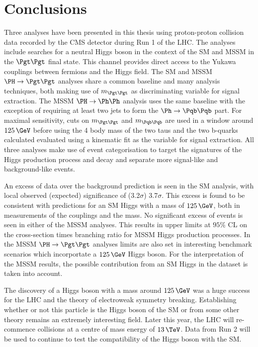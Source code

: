 \chapter{Conclusions}
\label{chap:conclusion}

Three analyses have been presented in this thesis using proton-proton collision
data recorded by the CMS detector during Run 1 of the LHC. The analyses include
searches for a neutral Higgs boson in the context of the \ac{SM} and \ac{MSSM}
in the $\Pgt\Pgt$ final state. This channel provides direct access to the Yukawa
couplings between fermions and the Higgs field. The \ac{SM} and \ac{MSSM}
$\PH\to\Pgt\Pgt$ analyses share a common baseline and many analysis techniques,
both making use of $m_{\Pgt\Pgt}$ as discriminating variable for signal
extraction. The \ac{MSSM} $\PH\to\Ph\Ph$ analysis uses the same baseline with
the exception of requiring at least two jets to form the $\Ph\to\Pqb\Pqb$ part.
For maximal sensitivity, cuts on $m_{\Pgt\Pgt}$ and $m_{\Pqb\Pqb}$ are used in a
window around $125\,\GeV$ before using the 4 body mass of the two taus and the 
two b-quarks calculated evaluated using a kinematic fit as the variable for
signal extraction. All three analyses make use of event categorisation to target 
the signatures of the Higgs production process and decay and separate more signal-like and
background-like events.

An excess of data over the background prediction is seen in the \ac{SM}
analysis, with local observed (expected) significance of (3.2$\sigma$)
3.7$\sigma$. This excess is found to be consistent with predictions for an
\ac{SM} Higgs with a mass of $125\,\GeV$, both in measurements of the
couplings and the mass. No significant excess of events is seen in either of the
\ac{MSSM} analyses. This results in upper limits at $95\%$ CL on the
cross-section times branching ratio for \ac{MSSM} Higgs production processes. In
the \ac{MSSM} $\HToTauTau$ analyses limits are also set in interesting benchmark
scenarios which incorportate a $125\,\GeV$ Higgs boson. For the interpretation of
the \ac{MSSM} results, the possible contribution from an \ac{SM} Higgs in the
dataset is taken into account. 

The discovery of a Higgs boson with a mass around $125\,\GeV$ was a huge success 
for the LHC and the theory of electroweak symmetry breaking. Establishing
whether or not this particle is the Higgs boson of the \ac{SM} or from some
other theory remains an extremely interesting field. Later this year, the LHC
will re-commence collisions at a centre of mass energy of $13\,\TeV$. Data from
Run 2 will be used to continue to test the compatibility of the Higgs boson with
the \ac{SM}.


